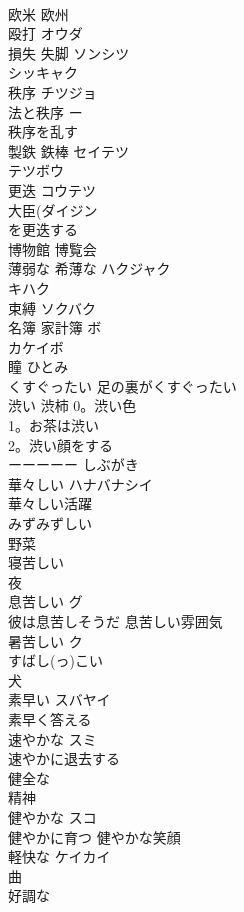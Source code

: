 \documentclass[8pt]{extreport}
\begin{document}
\begin{CJK}{UTF8}{min}
\\	欧米 欧州	
\\	殴打	オウダ 
\\	損失 失脚	ソンシツ 
\\	シッキャク 
\\	秩序	チツジョ 
\\	法と秩序 ー
\\	秩序を乱す　
\\	製鉄 鉄棒	セイテツ 
\\	テツボウ 
\\	更迭	コウテツ　
\\	大臣(ダイジン 
\\	を更迭する
\\	博物館 博覧会	
\\	薄弱な 希薄な	ハクジャク 
\\	キハク 
\\	束縛	ソクバク 
\\	名簿 家計簿	ボ 
\\	カケイボ 
\\	瞳	ひとみ 
\\	くすぐったい	足の裏がくすぐったい 
\\	渋い 渋柿	0。渋い色 
\\	1。お茶は渋い 
\\	2。渋い顔をする 
\\	ーーーーー しぶがき 
\\	華々しい	ハナバナシイ 
\\	華々しい活躍 
\\	みずみずしい	
\\	野菜
\\	寝苦しい	
\\	夜
\\	息苦しい	グ
\\	彼は息苦しそうだ 息苦しい雰囲気 
\\	暑苦しい	ク 
\\	すばし(っ)こい	
\\	犬
\\	素早い	スバヤイ 
\\	素早く答える
\\	速やかな	スミ 
\\	速やかに退去する 
\\	健全な	
\\	精神
\\	健やかな	スコ 
\\	健やかに育つ 健やかな笑顔 
\\	軽快な	ケイカイ 
\\	曲
\\	好調な	

\end{CJK}
\end{document}
